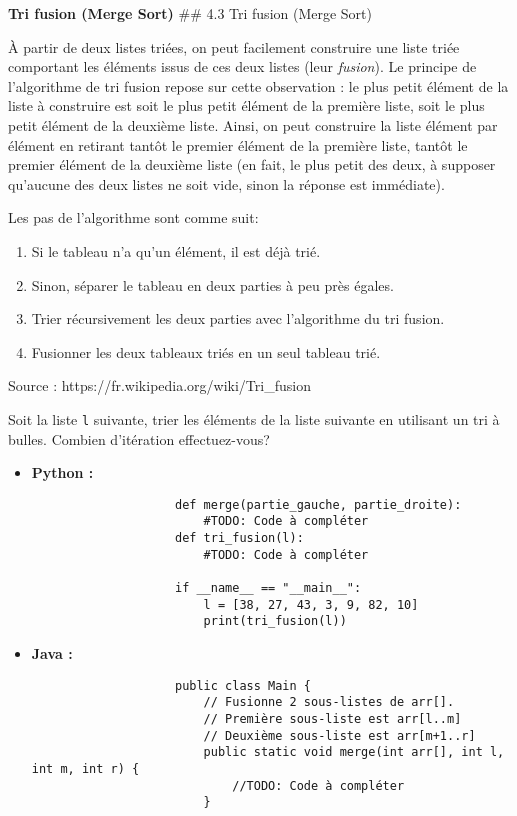 \begin{Exercice} [20 minutes] \textbf{Tri fusion (Merge Sort)}
    ## 4.3 Tri fusion (Merge Sort)

    À partir de deux listes triées, on peut facilement construire une liste triée comportant les éléments issus de ces deux listes (leur \textit{fusion}). Le principe de l'algorithme de tri fusion repose sur cette observation : le plus petit élément de la liste à construire est soit le plus petit élément de la première liste, soit le plus petit élément de la deuxième liste. Ainsi, on peut construire la liste élément par élément en retirant tantôt le premier élément de la première liste, tantôt le premier élément de la deuxième liste (en fait, le plus petit des deux, à supposer qu'aucune des deux listes ne soit vide, sinon la réponse est immédiate). 
    
    Les pas de l'algorithme sont comme suit:
    \begin{enumerate}
        \item Si le tableau n'a qu'un élément, il est déjà trié.
        \item Sinon, séparer le tableau en deux parties à peu près égales.
        \item Trier récursivement les deux parties avec l'algorithme du tri fusion.
        \item Fusionner les deux tableaux triés en un seul tableau trié.
    \end{enumerate}
    
    Source : https://fr.wikipedia.org/wiki/Tri_fusion
    
    Soit la liste \lstinline{l} suivante, trier les éléments de la liste suivante en utilisant un tri à bulles. Combien d'itération effectuez-vous?
    
    \begin{itemize}
        \item \textbf{Python :}
                \begin{verbatim}
                    def merge(partie_gauche, partie_droite):
                        #TODO: Code à compléter
                    def tri_fusion(l):
                        #TODO: Code à compléter
                    
                    if __name__ == "__main__":
                        l = [38, 27, 43, 3, 9, 82, 10]
                        print(tri_fusion(l))
                \end{verbatim}
        \item \textbf{Java :}
                \begin{verbatim}
                    public class Main {
                        // Fusionne 2 sous-listes de arr[]. 
                        // Première sous-liste est arr[l..m] 
                        // Deuxième sous-liste est arr[m+1..r] 
                        public static void merge(int arr[], int l, int m, int r) {
                            //TODO: Code à compléter 
                        }
                        

\end{verbatim}
\end{itemize}
\end{Exercice}

